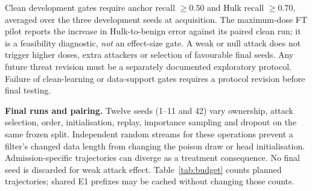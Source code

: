 \documentclass[10pt,a4paper]{article}
\begin{document}
Clean development gates require anchor recall $\ge0.50$ and Hulk recall $\ge0.70$, averaged over the three development seeds at acquisition. The maximum-dose FT pilot reports the increase in Hulk-to-benign error against its paired clean run; it is a feasibility diagnostic, \emph{not} an effect-size gate. A weak or null attack does not trigger higher doses, extra attackers or selection of favourable final seeds. Any future threat revision must be a separately documented exploratory protocol. Failure of clean-learning or data-support gates requires a protocol revision before final testing.

\textbf{Final runs and pairing.} Twelve seeds (1--11 and 42) vary ownership, attack selection, order, initialisation, replay, importance sampling and dropout on the same frozen split. Independent random streams for these operations prevent a filter's changed data length from changing the poison draw or head initialisation. Admission-specific trajectories can diverge as a treatment consequence. No final seed is discarded for weak attack effect. Table~\ref{tab:budget} counts planned trajectories; shared E1 prefixes may be cached without changing those counts.
\end{document}

